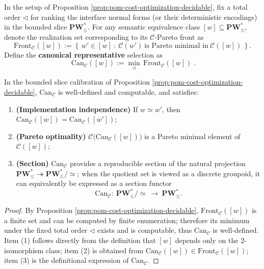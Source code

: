 \begin{definition}\label{def:pom-cost-canonical-representative}
In the setup of Proposition \ref{prop:pom-cost-optimization-decidable}, fix a total order \(\triangleleft\) for ranking the interface normal forms (or their deterministic encodings) in the bounded slice \(\mathbf{PW}^{\ast}_{\le}\).
For any semantic equivalence class \([w]\subseteq \mathbf{PW}^{\ast}_{\le}\), denote the realization set corresponding to its \(\mathcal{C}\)-Pareto front as
\[
\mathrm{Front}_{\mathcal C}([w])
:=
\left\{\,w'\in [w]\ :\ \mathcal{C}(w')\ \text{is Pareto minimal in}\ \mathcal{C}([w])\,\right\}.
\]
Define the \textbf{canonical representative} selection as
\[
\boxed{\;
\mathrm{Can}_{\mathcal C}([w])
:=
\min_{\triangleleft}\,\mathrm{Front}_{\mathcal C}([w])\; }.
\]
\end{definition}

\begin{corollary}\label{cor:pom-cost-canonical-representative-functor}
In the bounded slice calibration of Proposition \ref{prop:pom-cost-optimization-decidable}, \(\mathrm{Can}_{\mathcal C}\) is well-defined and computable, and satisfies:
\begin{enumerate}
  \item \textbf{(Implementation independence)} If \(w\simeq w'\), then \(\mathrm{Can}_{\mathcal C}([w])=\mathrm{Can}_{\mathcal C}([w'])\);
  \item \textbf{(Pareto optimality)} \(\mathcal{C}\bigl(\mathrm{Can}_{\mathcal C}([w])\bigr)\) is a Pareto minimal element of \(\mathcal{C}([w])\);
  \item \textbf{(Section)} \(\mathrm{Can}_{\mathcal C}\) provides a reproducible section of the natural projection \(\mathbf{PW}^{\ast}_{\le}\twoheadrightarrow \mathbf{PW}^{\ast}_{\le}/\!\!\simeq\); when the quotient set is viewed as a discrete groupoid, it can equivalently be expressed as a section functor
  \[
  \mathrm{Can}_{\mathcal C}:\ \mathbf{PW}^{\ast}_{\le}/\!\!\simeq\ \longrightarrow\ \mathbf{PW}^{\ast}_{\le}.
  \]
\end{enumerate}
\end{corollary}
\begin{proof}
By Proposition \ref{prop:pom-cost-optimization-decidable}, \(\mathrm{Front}_{\mathcal C}([w])\) is a finite set and can be computed by finite enumeration; therefore its minimum under the fixed total order \(\triangleleft\) exists and is computable, thus \(\mathrm{Can}_{\mathcal C}\) is well-defined.
Item (1) follows directly from the definition that \([w]\) depends only on the \(2\)-isomorphism class; item (2) is obtained from \(\mathrm{Can}_{\mathcal C}([w])\in \mathrm{Front}_{\mathcal C}([w])\); item (3) is the definitional expression of \(\mathrm{Can}_{\mathcal C}\).
\end{proof}

